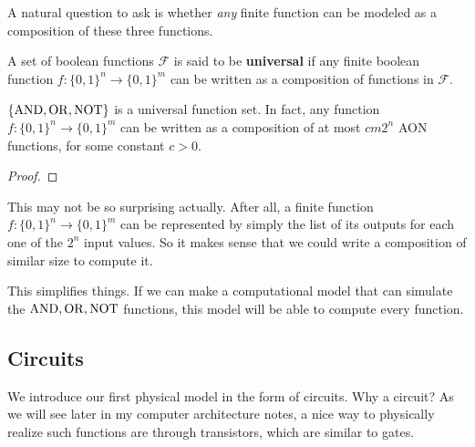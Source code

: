   A natural question to ask is whether \textit{any} finite function can be modeled as a composition of these three functions. 

  \begin{definition}
    A set of boolean functions $\mathcal{F}$ is said to be \textbf{universal} if any finite boolean function $f: \{0, 1\}^n \to \{0, 1\}^m$ can be written as a composition of functions in $\mathcal{F}$.
  \end{definition}

  \begin{theorem}
    \label{thm:aon_univ}
    $\{\AND, \OR, \NOT\}$ is a universal function set. In fact, any function $f: \{0,1\}^n \longrightarrow \{0,1\}^m$ can be written as a composition of at most $c m 2^n$ AON functions, for some constant $c > 0$. 
  \end{theorem}
  \begin{proof}
    
  \end{proof}

  This may not be so surprising actually. After all, a finite function $f: \{0,1\}^n \longrightarrow \{0,1\}^m$ can be represented by simply the list of its outputs for each one of the $2^n$ input values. So it makes sense that we could write a composition of similar size to compute it. 

  This simplifies things. If we can make a computational model that can simulate the $\AND, \OR, \NOT$ functions, this model will be able to compute every function. 

\subsection{Circuits}

  We introduce our first physical model in the form of circuits. Why a circuit? As we will see later in my computer architecture notes, a nice way to physically realize such functions are through transistors, which are similar to gates. 

